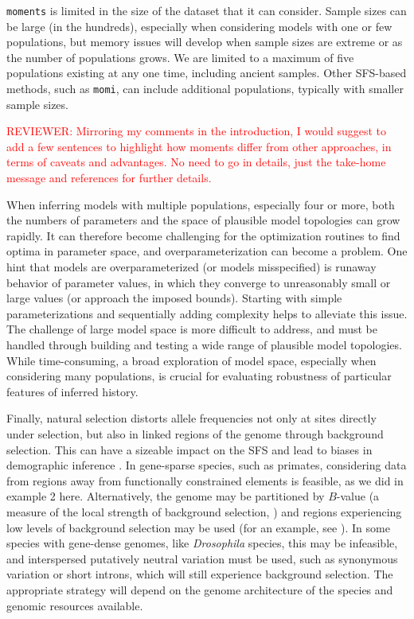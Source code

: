 \documentclass[]{article}
\newcommand{\reviewercomment}[1]{{\textcolor{red}{REVIEWER: #1}}}
\newcommand{\moments}{\texttt{moments}\xspace}
\newcommand{\momi}{\texttt{momi}\xspace}
\begin{document}
\moments is limited in the size of the dataset that it can consider. Sample
sizes can be large (in the hundreds), especially when considering models with
one or few populations, but memory issues will develop when sample sizes are
extreme or as the number of populations grows. We are limited to a maximum of
five populations existing at any one time, including ancient samples. Other
SFS-based methods, such as \momi \cite{kamm2020efficiently, dilber2024faster},
can include additional populations, typically with smaller sample sizes.

\reviewercomment{Mirroring my comments in the introduction, I would suggest to add a few sentences to highlight how moments differ from other approaches, in terms of caveats and advantages. No need to go in details, just the take-home message and references for further details.}

When inferring models with multiple populations, especially four or more, both
the numbers of parameters and the space of plausible model topologies can grow
rapidly. It can therefore become challenging for the optimization routines to
find optima in parameter space, and overparameterization can become a problem.
One hint that models are overparameterized (or models misspecified) is runaway
behavior of parameter values, in which they converge to unreasonably small or
large values (or approach the imposed bounds). Starting with simple
parameterizations and sequentially adding complexity helps to alleviate this
issue. The challenge of large model space is more difficult to address, and
must be handled through building and testing a wide range of plausible model
topologies. While time-consuming, a broad exploration of model space,
especially when considering many populations, is crucial for evaluating
robustness of particular features of inferred history.

Finally, natural selection distorts allele frequencies not only at sites
directly under selection, but also in linked regions of the genome through
background selection. This can have a sizeable impact on the SFS and lead to
biases in demographic inference \cite{ewing2016consequences, johri2021impact}.
In gene-sparse species, such as primates, considering data from regions away
from functionally constrained elements is feasible, as we did in example 2
here.  Alternatively, the genome may be partitioned by $B$-value (a measure of
the local strength of background selection, \cite{mcvicker2009widespread}) and
regions experiencing low levels of background selection may be used (for an
example, see \cite{medina2023demographic}). In some species with gene-dense
genomes, like \emph{Drosophila} species, this may be infeasible, and
interspersed putatively neutral variation must be used, such as synonymous
variation or short introns, which will still experience background selection.
The appropriate strategy will depend on the genome architecture of the species
and genomic resources available.
\end{document}
